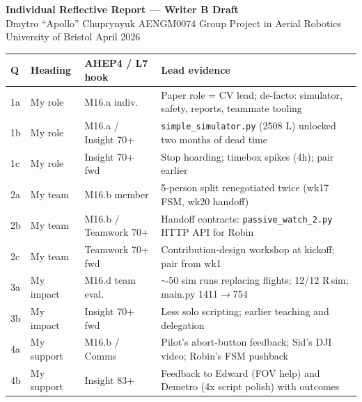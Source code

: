 \documentclass[11pt,a4paper]{article}
\begin{document}
\begin{center}
  {\large\bfseries Individual Reflective Report --- Writer B Draft}\\[2pt]
  {\small Dmytro ``Apollo'' Chuprynyuk \textbar{} AENGM0074 Group Project in Aerial Robotics \textbar{} University of Bristol \textbar{} April 2026}
\end{center}
\vspace{-6pt}

{\footnotesize
\begin{tabularx}{\textwidth}{@{}l l l X@{}}
\toprule
\textbf{Q} & \textbf{Heading} & \textbf{AHEP4 / L7 hook} & \textbf{Lead evidence} \\
\midrule
1a & My role & M16.a indiv. & Paper role = CV lead; de-facto: simulator, safety, reports, teammate tooling \\
1b & My role & M16.a / Insight 70+ & \texttt{simple\_simulator.py} (2508 L) unlocked two months of dead time \\
1c & My role & Insight 70+ fwd & Stop hoarding; timebox spikes (4h); pair earlier \\
2a & My team & M16.b member & 5-person split renegotiated twice (wk17 FSM, wk20 handoff) \\
2b & My team & M16.b / Teamwork 70+ & Handoff contracts: \texttt{passive\_watch\_2.py} HTTP API for Robin \\
2c & My team & Teamwork 70+ fwd & Contribution-design workshop at kickoff; pair from wk1 \\
3a & My impact & M16.d team eval. & $\sim$50 sim runs replacing flights; 12/12 R\,sim; main.py 1411$\to$754 \\
3b & My impact & Insight 70+ fwd & Less solo scripting; earlier teaching and delegation \\
4a & My support & M16.b / Comms & Pilot's abort-button feedback; Sid's DJI video; Robin's FSM pushback \\
4b & My support & Insight 83+ & Feedback to Edward (FOV help) and Demetro (4x script polish) with outcomes \\
\bottomrule
\end{tabularx}}
\vspace{-2pt}





\end{document}
